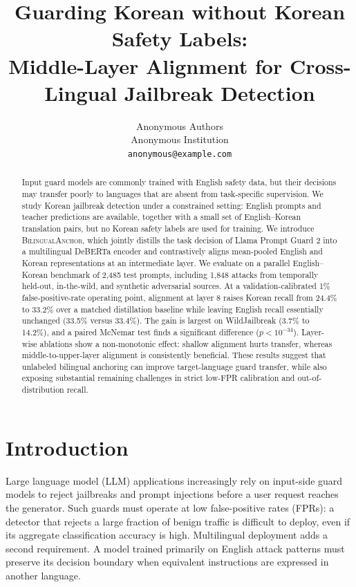 \documentclass[10pt,twocolumn]{article}
\title{Guarding Korean without Korean Safety Labels:\\
Middle-Layer Alignment for Cross-Lingual Jailbreak Detection}
\author{Anonymous Authors \\
Anonymous Institution \\
\texttt{anonymous@example.com}}
\date{}
\newcommand{\method}{\textsc{BilingualAnchor}}
\begin{document}
\maketitle

\begin{abstract}
Input guard models are commonly trained with English safety data, but their
decisions may transfer poorly to languages that are absent from task-specific
supervision. We study Korean jailbreak detection under a constrained setting:
English prompts and teacher predictions are available, together with a small
set of English--Korean translation pairs, but no Korean safety labels are used
for training. We introduce \method, which jointly distills the task decision
of Llama Prompt Guard 2 into a multilingual DeBERTa encoder and contrastively
aligns mean-pooled English and Korean representations at an intermediate
layer. We evaluate on a parallel English--Korean benchmark of 2,485 test
prompts, including 1,848 attacks from temporally held-out,
in-the-wild, and synthetic adversarial sources. At a validation-calibrated 1\%
false-positive-rate operating point, alignment at layer 8 raises Korean recall
from 24.4\% to 33.2\% over a matched distillation baseline while leaving
English recall essentially unchanged (33.5\% versus 33.4\%). The gain is
largest on WildJailbreak (3.7\% to 14.2\%), and a paired McNemar test finds a
significant difference ($p<10^{-34}$). Layer-wise ablations show a non-monotonic
effect: shallow alignment hurts transfer, whereas middle-to-upper-layer
alignment is consistently beneficial. These results suggest that unlabeled
bilingual anchoring can improve target-language guard transfer, while also
exposing substantial remaining challenges in strict low-FPR calibration and
out-of-distribution recall.
\end{abstract}

\section{Introduction}

Large language model (LLM) applications increasingly rely on input-side guard
models to reject jailbreaks and prompt injections before a user request reaches
the generator. Such guards must operate at low false-positive rates (FPRs): a
detector that rejects a large fraction of benign traffic is difficult to deploy,
even if its aggregate classification accuracy is high. Multilingual deployment
adds a second requirement. A model trained primarily on English attack patterns
must preserve its decision boundary when equivalent instructions are expressed
in another language.
\end{document}
